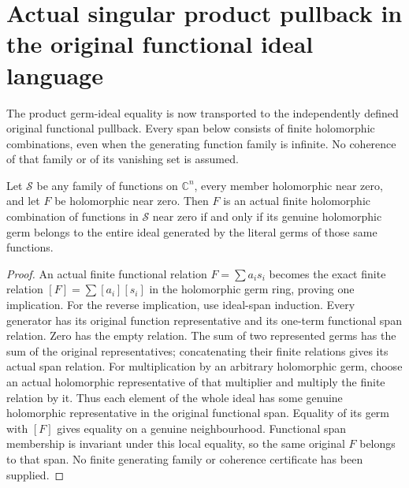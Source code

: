 \section{Actual singular product pullback in the original functional ideal language}

The product germ-ideal equality is now transported to the independently
defined original functional pullback. Every span below consists of finite
holomorphic combinations, even when the generating function family is
infinite. No coherence of that family or of its vanishing set is assumed.

\begin{lemma}
\label{hir:actual-functional-span-origin-germ-span}
\leanok
Let $\mathcal S$ be any family of functions on $\mathbb C^n$, every member
holomorphic near zero, and let $F$ be holomorphic near zero. Then $F$ is
an actual finite holomorphic combination of functions in $\mathcal S$
near zero if and only if its genuine holomorphic germ belongs to the
entire ideal generated by the literal germs of those same functions.
\end{lemma}
\begin{proof}
An actual finite functional relation $F=\sum a_i s_i$ becomes the exact
finite relation $[F]=\sum[a_i][s_i]$ in the holomorphic germ ring, proving
one implication. For the reverse implication, use ideal-span induction.
Every generator has its original function representative and its
one-term functional span relation. Zero has the empty relation. The sum
of two represented germs has the sum of the original representatives;
concatenating their finite relations gives its actual span relation.
For multiplication by an arbitrary holomorphic germ, choose an actual
holomorphic representative of that multiplier and multiply the finite
relation by it. Thus each element of the whole ideal has some genuine
holomorphic representative in the original functional span. Equality
of its germ with $[F]$ gives equality on a genuine neighbourhood.
Functional span membership is invariant under this local equality,
so the same original $F$ belongs to that span. No finite generating
family or coherence certificate has been supplied.
\end{proof}

